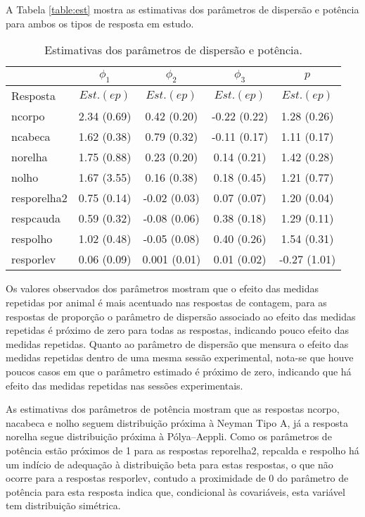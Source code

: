A Tabela \autoref{table:est} mostra as estimativas dos parâmetros de dispersão e potência para ambos os tipos de resposta em estudo.

\begin{table}[H]
\centering
\caption{Estimativas dos parâmetros de dispersão e potência.}
\begin{tabular}{lcccc}
\bottomrule
               & $\phi_{1}$ & $\phi_{2}$  & $\phi_{3}$ & $p$ \\
\bottomrule
  Resposta     & $Est. (ep)$ & $Est. (ep)$  & $Est. (ep)$ & $Est. (ep)$ \\
\bottomrule
  ncorpo & 2.34 (0.69) &  0.42 (0.20) &  -0.22 (0.22) &  1.28  (0.26) \\
  ncabeca & 1.62 (0.38) &  0.79 (0.32) &  -0.11 (0.17) &  1.11  (0.17) \\
  norelha & 1.75 (0.88) &  0.23 (0.20) &  0.14  (0.21) &  1.42  (0.28) \\
  nolho & 1.67 (3.55) &  0.16 (0.38) &  0.18  (0.45) &  1.21  (0.77) \\
  resporelha2 & 0.75 (0.14) & -0.02 (0.03) & 0.07 (0.07) & 1.20 (0.04) \\
  respcauda & 0.59 (0.32) &  -0.08 (0.06) &  0.38 (0.18) &  1.29 (0.11) \\
  respolho & 1.02 (0.48) &  -0.05 (0.08) &  0.40 (0.26) &  1.54 (0.31) \\
  resporlev & 0.06 (0.09) &  0.001 (0.01) &  0.01 (0.02) & -0.27 (1.01) \\
 \bottomrule
\end{tabular}
\label{table:est}
\end{table}

Os valores observados dos parâmetros mostram que o efeito das medidas repetidas por animal é mais acentuado nas respostas de contagem, para as respostas de proporção o parâmetro de dispersão associado ao efeito das medidas repetidas é próximo de zero para todas as respostas, indicando pouco efeito das medidas repetidas. Quanto ao parâmetro de dispersão que mensura o efeito das medidas repetidas dentro de uma mesma sessão experimental, nota-se que houve poucos casos em que o parâmetro estimado é próximo de zero, indicando que há efeito das medidas repetidas nas sessões experimentais.

As estimativas dos parâmetros de potência mostram que as respostas ncorpo, nacabeca e nolho seguem distribuição próxima à Neyman Tipo A, já a resposta norelha segue distribuição próxima à Pólya–Aeppli. Como os parâmetros de potência estão próximos de 1 para as respostas reporelha2, repcalda e respolho há um indício de adequação à distribuição beta para estas respostas, o que não ocorre para a respostas resporlev, contudo a proximidade de 0 do parâmetro de potência para esta resposta indica que, condicional às covariáveis, esta variável tem distribuição simétrica.

